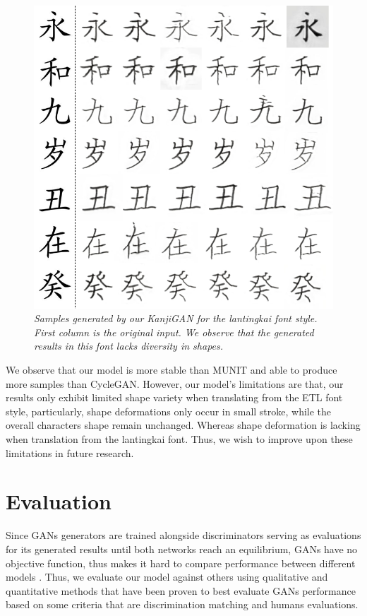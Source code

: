 \documentclass[12pt]{report}
\begin{document}
\begin{figure}[H]
	\centering
	\includegraphics[scale=0.9]{kanji-gan-results-3}
	\caption{\textit{Samples generated by our KanjiGAN for the lantingkai font style. First column is the original input. We observe that the generated results in this font lacks diversity in shapes.}}
	\label{fig:kanji-gan-results-3}
\end{figure}

We observe that our model is more stable than MUNIT and able to produce more samples than CycleGAN. However, our model's limitations are that, our results only exhibit limited shape variety when translating from the ETL font  style, particularly, shape deformations only occur in small stroke, while the overall characters shape remain unchanged. Whereas shape deformation is lacking when translation from the lantingkai font. Thus, we wish to improve upon these limitations in future research.

\section{Evaluation}
Since GANs generators are trained alongside discriminators serving as evaluations for its generated results until both networks reach an equilibrium, GANs have no objective function, thus makes it hard to compare performance between different models \cite{training-gans}.
Thus, we evaluate our model against others using qualitative and quantitative methods that have been proven to best evaluate GANs performance based on some criteria\cite{gan-measure} that are discrimination matching and humans evaluations.
\end{document}

